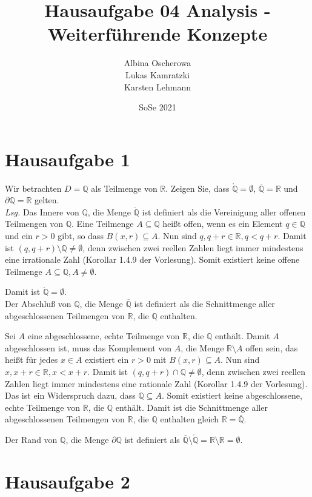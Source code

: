 \documentclass{article}
\author{Albina Oscherowa \\ Lukas Kamratzki \\ Karsten Lehmann}
\date{SoSe 2021}
\title{Hausaufgabe 04 Analysis - Weiterführende Konzepte}
\begin{document}
\section*{Hausaufgabe 1}

Wir betrachten $D = \mathbb{Q}$ als Teilmenge von $\mathbb{R}$.
Zeigen Sie, dass $\mathring{\mathbb{Q}} = \emptyset$, $\overline{\mathbb{Q}} = \mathbb{R}$
und $\partial \mathbb{Q} = \mathbb{R}$ gelten. \\

\textit{Lsg.} Das Innere von $\mathbb{Q}$, die Menge $\mathring{\mathbb{Q}}$ ist definiert als die Vereinigung aller
offenen Teilmengen von $\mathbb{Q}$.
Eine Teilmenge $A \subseteq \mathbb{Q}$ heißt offen, wenn es ein Element $q \in \mathbb{Q}$
und ein $r > 0$ gibt, so dass $B(x, r) \subseteq A$.
Nun sind $q, q + r \in \mathbb{R}, q < q + r$.
Damit ist $(q, q + r) \setminus \mathbb{Q} \ne \emptyset$, denn zwischen zwei reellen Zahlen liegt
immer mindestens eine irrationale Zahl (Korollar 1.4.9 der Vorlesung).
Somit existiert keine offene Teilmenge $A \subseteq \mathbb{Q}, A \ne \emptyset$.

Damit ist $\mathring{\mathbb{Q}} = \emptyset$. \\

Der Abschluß von $\mathbb{Q}$, die Menge $\overline{\mathbb{Q}}$ ist definiert als
die Schnittmenge aller abgeschlossenen Teilmengen von $\mathbb{R}$, die $\mathbb{Q}$
enthalten.

Sei $A$ eine abgeschlossene, echte Teilmenge von $\mathbb{R}$, die $\mathbb{Q}$ enthält.
Damit $A$ abgeschlossen ist, muss das Komplement von $A$, die Menge $\mathbb{R} \setminus A$
offen sein, das heißt für jedes $x \in A$ existiert ein $r > 0$ mit $B(x, r) \subseteq A$.
Nun sind $x, x + r \in \mathbb{R}, x < x + r$.
Damit ist $(q, q + r) \cap \mathbb{Q} \ne \emptyset$, denn zwischen zwei reellen Zahlen liegt
immer mindestens eine rationale Zahl (Korollar 1.4.9 der Vorlesung).
Das ist ein Widerspruch dazu, dass $\mathbb{Q} \subseteq A$.
Somit existiert keine abgeschlossene, echte Teilmenge von $\mathbb{R}$, die $\mathbb{Q}$ enthält.
Damit ist die Schnittmenge aller abgeschlossenen Teilmengen von $\mathbb{R}$, die $\mathbb{Q}$
enthalten gleich $\mathbb{R} = \overline{\mathbb{Q}}$.

Der Rand von $\mathbb{Q}$, die Menge $\partial \mathbb{Q}$ ist definiert als
$\overline{\mathbb{Q}} \setminus \mathring{\mathbb{Q}} = \mathbb{R} \setminus \mathbb{R} = \emptyset$.

\section*{Hausaufgabe 2}
\end{document}

